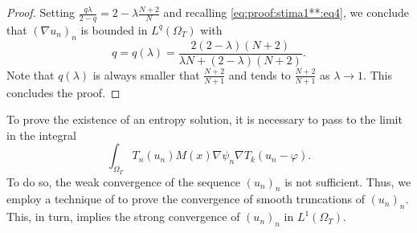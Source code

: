 \documentclass{amsart}
\numberwithin{equation}{section}
\def\elleomT#1{L^{#1}(\Omega_T)}
\def\ioT{\int_{\Omega_T}}
\begin{document}
\begin{proof}
    Setting $\frac{q\lambda}{2-q}={2-\lambda}\frac{N+2}{N}$ and recalling \eqref{eq:proof:stima1**:eq4}, we conclude that $(\nabla u_n)_n$ is bounded in $\elleomT q$ with
    $$q=q(\lambda)=\frac{2(2-\lambda)(N+2)}{\lambda N +(2-\lambda)(N+2)}.$$
    Note that $q(\lambda)$ is always smaller that $\frac{N+2}{N+1}$ and tends to $\frac{N+2}{N+1}$ as $\lambda\to1$. This concludes the proof.
\end{proof}

{To prove the existence of an entropy solution, it is necessary to pass to the limit in the integral
$$\ioT T_n(u_n)M(x)\nabla\psi_n \nabla T_k (u_n-\varphi).$$
To do so, the weak convergence of the sequence $(u_n)_n$ is not sufficient. Thus, we employ a technique of \cite{PorrettaExistenceParabolic} to prove the convergence of smooth truncations of $(u_n)_n$. This, in turn, implies the strong convergence of $(u_n)_n$ in $\elleomT1$.}
\end{document}
